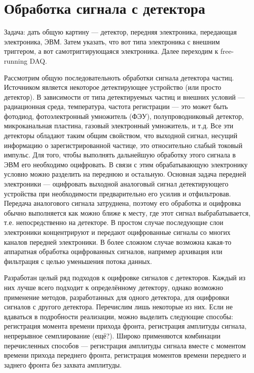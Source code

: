 \section{Обработка сигнала с детектора}\label{sec:secSignalProcessing}

Задача: дать общую картину --- детектор, передняя электроника, передающая электроника, ЭВМ. Затем указать, что вот типа электроника с внешним триггером, а вот самотриггирующаяся электроника. Далее переходим к free-running DAQ.

Рассмотрим общую последовательноть обработки сигнала детектора частиц. Источником является некоторое детектирующее устройство (или просто детектор). В зависимости от типа детектируемых частиц и внешних условий --- радиационная среда, температура, частота регистрации --- это может быть фотодиод, фотоэлектронный умножитель (ФЭУ), полупроводниковый детектор, микроканальная пластина, газовый электронный умножитель, и т.д. Все эти детекторы обладают таким общим свойством, что выходной сигнал, несущий информацию о зарегистрированной частице, это относительно слабый токовый импульс. Для того, чтобы выполнять дальнейшую обработку этого сигнала в ЭВМ его необходимо оцифровать.
В связи с этим обрабатывающую электронику условно можно разделить на переднюю и остальную. Основная задача передней электроники --- оцифровать выходной аналоговый сигнал детектирующего устройства при необходимости предварительно его усилив и отфильтровав. Передача аналогового сигнала затруднена, поэтому его обработка и оцифровка обычно выполняется как можно ближе к месту, где этот сигнал выбрабатывается, т.е. непосредственно на детекторе. В простом случае последующие слои электроники концентрируют и передают оцифрованные сигналы со многих каналов передней электроники. В более сложном случае возможна какая-то аппаратная обработка оцифрованных сигналов, например архивация или фильтрация с целью уменьшения потока данных.

Разработан целый ряд подходов к оцифровке сигналов с детекторов. Каждый из них лучше всего подходит к определённому детектору, однако возможно применение методов, разработанных для одного детектора, для оцифровки сигналов с другого детектора. Перечислим лишь некоторые из них. Если не вдаваться в подробности реализации, можно выделить следующие способы: регистрация момента времени прихода фронта, регистрация амплитуды сигнала, непрерывное семплирование (ещё?). Широко применяются комбинации перечисленных способов --- регистрация амплитуды сигнала вместе с моментом времени прихода переднего фронта, регистрация моментов времени переднего и заднего фронта без захвата амплитуды.

